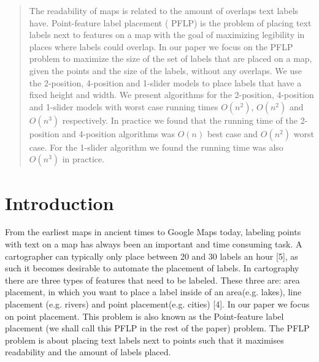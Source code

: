 \documentclass[crop=false,a4paper,oneside,11pt]{standalone}
\begin{document}
\begin{abstract}
The readability of maps is related to the amount of overlaps text labels have. Point-feature label placement ( PFLP) is the problem of placing text labels next to features on a map with the goal of maximizing legibility in places where labels could overlap. In our paper we focus on the PFLP problem to maximize the size of the set of labels that are placed on a map, given the points and the size of the labels, without any overlaps. We use the 2-position, 4-position and 1-slider models to place labels that have a fixed height and width. We present algorithms for the 2-position, 4-position and 1-slider models with worst case running times $O(n^2)$, $O(n^2)$ and $O(n^3)$ respectively. In practice we found that the running time of the 2-position and 4-position algorithms was  $O(n)$ best case and $O(n^2)$ worst case. For the 1-slider algorithm we found the running time was also $O(n^3)$ in practice.
\end{abstract}

\section{Introduction}
From the earliest maps in ancient times to Google Maps today, labeling points with text on a map has always been an important and time consuming task. A cartographer can typically only place between 20 and 30 labels an hour [5], as such it becomes desirable to automate the placement of labels. In cartography there are three types of features that need to be labeled. These three are: area placement, in which you want to place a label inside of an area(e.g. lakes), line placement (e.g. rivers) and point placement(e.g. cities) [4]. In our paper we focus on point placement. This problem is also known as the Point-feature label placement (we shall call this PFLP in the rest of the paper) problem. The PFLP problem is about placing text labels next to points such that it maximises readability and the amount of labels placed.
\end{document}
